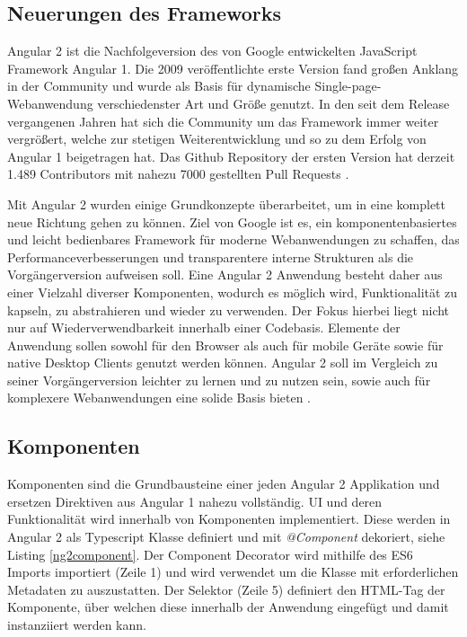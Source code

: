 \subsection{Neuerungen des Frameworks}

Angular 2 ist die Nachfolgeversion des von Google entwickelten JavaScript Framework Angular 1.
Die 2009 veröffentlichte erste Version fand großen Anklang in der Community
und wurde als Basis für dynamische Single-page-Webanwendung verschiedenster Art und Größe genutzt.
In den seit dem Release vergangenen Jahren hat sich die Community um das Framework immer weiter vergrößert,
welche zur stetigen Weiterentwicklung und so zu dem Erfolg von Angular 1 beigetragen hat.
Das Github Repository der ersten Version hat derzeit 1.489 Contributors mit nahezu 7000 gestellten Pull Requests \cite{ng1-github}.

Mit Angular 2 wurden einige Grundkonzepte überarbeitet, um in eine komplett neue Richtung gehen zu können.
Ziel von Google ist es, ein komponentenbasiertes und leicht bedienbares Framework für moderne
Webanwendungen zu schaffen, das Performanceverbesserungen und transparentere interne Strukturen als die Vorgängerversion aufweisen soll.
Eine Angular 2 Anwendung besteht daher aus einer Vielzahl diverser Komponenten, wodurch es möglich wird,
Funktionalität zu kapseln, zu abstrahieren und wieder zu verwenden. Der Fokus hierbei liegt nicht nur auf Wiederverwendbarkeit innerhalb einer Codebasis.
Elemente der Anwendung sollen sowohl für den Browser als auch für mobile Geräte sowie für native Desktop Clients genutzt werden können.
Angular 2 soll im Vergleich zu seiner Vorgängerversion leichter zu lernen und zu nutzen sein,
sowie auch für komplexere Webanwendungen eine solide Basis bieten \cite[11-12]{Angular2}.


\subsection{Komponenten}

Komponenten sind die Grundbausteine einer jeden Angular 2 Applikation und ersetzen Direktiven aus Angular 1 nahezu vollständig.
UI und deren Funktionalität wird innerhalb von Komponenten implementiert.
Diese werden in Angular 2 als Typescript Klasse definiert und mit \emph{@Component} dekoriert, siehe Listing \ref{ng2component}.
Der Component Decorator wird mithilfe des ES6 Imports importiert (Zeile 1) und wird verwendet um die Klasse mit erforderlichen Metadaten zu auszustatten.
Der Selektor (Zeile 5) definiert den HTML-Tag der Komponente, über welchen diese innerhalb der Anwendung eingefügt und damit instanziiert werden kann.

